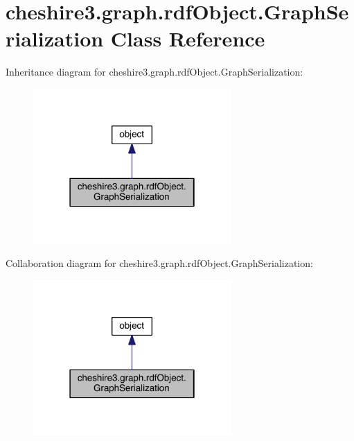 \hypertarget{classcheshire3_1_1graph_1_1rdf_object_1_1_graph_serialization}{\section{cheshire3.\-graph.\-rdf\-Object.\-Graph\-Serialization Class Reference}
\label{classcheshire3_1_1graph_1_1rdf_object_1_1_graph_serialization}
}


Inheritance diagram for cheshire3.\-graph.\-rdf\-Object.\-Graph\-Serialization\-:
\nopagebreak
\begin{figure}[H]
\begin{center}
\leavevmode
\includegraphics[width=214pt]{classcheshire3_1_1graph_1_1rdf_object_1_1_graph_serialization__inherit__graph}
\end{center}
\end{figure}


Collaboration diagram for cheshire3.\-graph.\-rdf\-Object.\-Graph\-Serialization\-:
\nopagebreak
\begin{figure}[H]
\begin{center}
\leavevmode
\includegraphics[width=214pt]{classcheshire3_1_1graph_1_1rdf_object_1_1_graph_serialization__coll__graph}
\end{center}
\end{figure}
